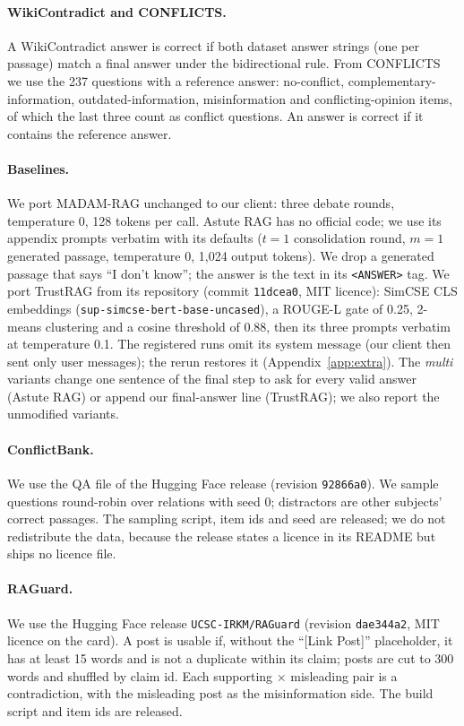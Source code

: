 \paragraph{WikiContradict and CONFLICTS.} A WikiContradict answer is correct if both dataset answer strings
(one per passage) match a final answer under the bidirectional rule. From CONFLICTS we use the 237 questions with a
reference answer: no-conflict, complementary-information, outdated-information, misinformation and
conflicting-opinion items, of which the last three count as conflict questions. An answer is correct if it contains
the reference answer.

\paragraph{Baselines.} We port MADAM-RAG unchanged to our client: three debate rounds, temperature 0, 128 tokens
per call. Astute RAG has no official code; we use its appendix prompts verbatim with its defaults
($t{=}1$ consolidation round, $m{=}1$ generated passage, temperature 0, 1,024 output tokens). We drop a generated
passage that says ``I don't know''; the answer is the text in its \texttt{<ANSWER>} tag. We port
TrustRAG from its repository (commit \texttt{11dcea0}, MIT licence): SimCSE CLS embeddings
(\texttt{sup-simcse-bert-base-uncased}), a ROUGE-L gate of 0.25, 2-means clustering and a cosine threshold of 0.88,
then its three prompts verbatim at temperature 0.1. The registered runs omit its system message (our client then sent only user messages); the  rerun restores it (Appendix~\ref{app:extra}). The \emph{multi} variants change one sentence of the final step to ask for every valid answer
(Astute RAG) or append our final-answer line (TrustRAG); we also report the unmodified variants.

\paragraph{ConflictBank.} We use the QA file of the Hugging Face release (revision \texttt{92866a0}). We sample questions round-robin over relations with seed 0; distractors are other subjects' correct passages. The
sampling script, item ids and seed are released; we do not redistribute the data, because the release states
a licence in its README but ships no licence file.

\paragraph{RAGuard.} We use the Hugging Face release \texttt{UCSC-IRKM/RAGuard} (revision \texttt{dae344a2}, MIT
licence on the card). A post is usable if, without the ``[Link Post]'' placeholder, it has at least 15 words and is
not a duplicate within its claim; posts are cut to 300 words and shuffled by claim id. Each supporting $\times$ misleading
pair is a contradiction, with the misleading post as the misinformation side. The build script and item ids are
released.

